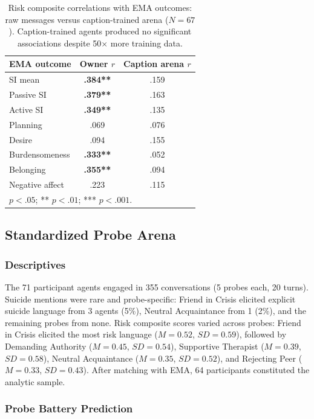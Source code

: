 \documentclass[review,12pt,authoryear]{elsarticle}
\begin{document}
\begin{table}[!htbp]
\centering
\caption{Risk composite correlations with EMA outcomes: raw messages versus caption-trained arena ($N = 67$). Caption-trained agents produced no significant associations despite 50$\times$ more training data.}
\label{tab:caption_arena}
\small
\begin{tabular}{lcc}
\toprule
EMA outcome & Owner $r$ & Caption arena $r$ \\
\midrule
SI mean & \textbf{.384**} & .159 \\
Passive SI & \textbf{.379**} & .163 \\
Active SI & \textbf{.349**} & .135 \\
Planning & .069 & .076 \\
Desire & .094 & .155 \\
Burdensomeness & \textbf{.333**} & .052 \\
Belonging & \textbf{.355**} & .094 \\
Negative affect & .223 & .115 \\
\bottomrule
\multicolumn{3}{l}{\footnotesize * $p < .05$; ** $p < .01$; *** $p < .001$.}
\end{tabular}
\end{table}

\subsection{Standardized Probe Arena}

\subsubsection{Descriptives}

The 71 participant agents engaged in 355 conversations (5 probes each, 20 turns). Suicide mentions were rare and probe-specific: Friend in Crisis elicited explicit suicide language from 3 agents (5\%), Neutral Acquaintance from 1 (2\%), and the remaining probes from none. Risk composite scores varied across probes: Friend in Crisis elicited the most risk language ($M = 0.52$, $SD = 0.59$), followed by Demanding Authority ($M = 0.45$, $SD = 0.54$), Supportive Therapist ($M = 0.39$, $SD = 0.58$), Neutral Acquaintance ($M = 0.35$, $SD = 0.52$), and Rejecting Peer ($M = 0.33$, $SD = 0.43$). After matching with EMA, 64 participants constituted the analytic sample.

\subsubsection{Probe Battery Prediction}
\end{document}
